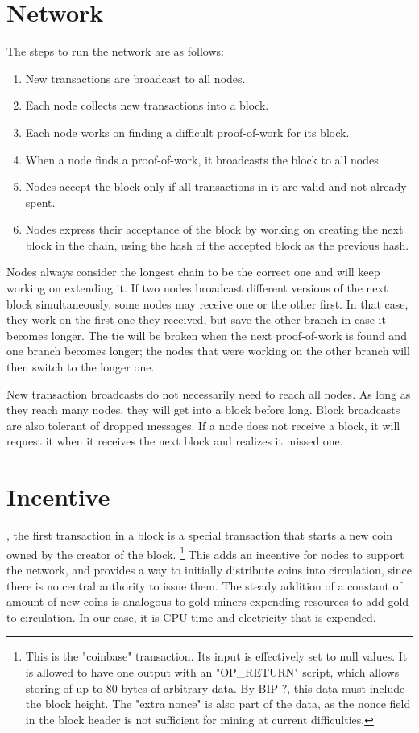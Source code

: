 \documentclass[nohyper]{tufte-handout}
\begin{document}
\section{Network}\label{network}

The steps to run the network are as follows:

\begin{enumerate}[1)]
\item
  New transactions are broadcast to all nodes.
\item
  Each node collects new transactions into a block.
\item
  Each node works on finding a difficult proof-of-work for its block.
\item
  When a node finds a proof-of-work, it broadcasts the block to all
  nodes.
\item
  Nodes accept the block only if all transactions in it are valid and
  not already spent.
\item
  Nodes express their acceptance of the block by working on creating the
  next block in the chain, using the hash of the accepted block as the
  previous hash.
\end{enumerate}

Nodes always consider the longest chain to be the correct one and will keep working on extending it. If two nodes broadcast different versions of the next block simultaneously, some nodes may receive one or the other first. In that case, they work on the first one they received, but save the other branch in case it becomes longer. The tie will be broken when the next proof-of-work is found and one branch becomes longer; the
nodes that were working on the other branch will then switch to the longer one.

New transaction broadcasts do not necessarily need to reach all nodes.
As long as they reach many nodes, they will get into a block before long. Block broadcasts are also tolerant of dropped messages. If a node does not receive a block, it will request it when it receives the next block and realizes it missed one.

\section{Incentive}\label{incentive}

, the first transaction in a block is a special transaction
that starts a new coin owned by the creator of the block.  \footnote{This is the "coinbase" transaction.  Its input is effectively set to null values.  It is allowed to have one output with an "OP\_RETURN" script, which allows storing of up to 80 bytes of arbitrary data.  By BIP ?, this data must include the block height.  The "extra nonce" is also part of the data, as the nonce field in the block header is not sufficient for mining at current difficulties.} This adds an
incentive for nodes to support the network, and provides a way to
initially distribute coins into circulation, since there is no central
authority to issue them. The steady addition of a constant of amount of
new coins is analogous to gold miners expending resources to add gold to
circulation. In our case, it is CPU time and electricity that is
expended.
\end{document}
